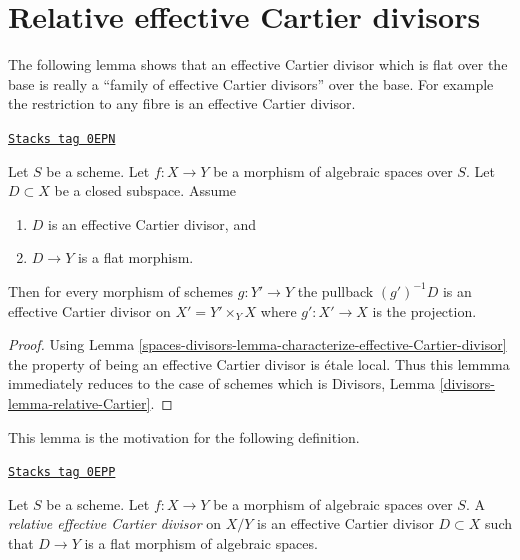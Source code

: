 \section{Relative effective Cartier divisors}
\label{spaces-divisors-section-effective-Cartier-morphisms}
The following lemma shows that an effective Cartier divisor which is
flat over the base is really a ``family of effective Cartier divisors''
over the base. For example the restriction to any fibre is an effective
Cartier divisor.

\begin{lemma}
\label{spaces-divisors-lemma-relative-Cartier}
\href{https://stacks.math.columbia.edu/tag/0EPN}{\texttt{Stacks tag 0EPN}}

Let $S$ be a scheme. Let $f : X \to Y$ be a morphism of
algebraic spaces over $S$. Let $D \subset X$ be a closed subspace.
Assume
\begin{enumerate}
\item $D$ is an effective Cartier divisor, and
\item $D \to Y$ is a flat morphism.
\end{enumerate}
Then for every morphism of schemes $g : Y' \to Y$ the pullback
$(g')^{-1}D$ is an effective Cartier divisor on $X' = Y' \times_Y X$
where $g' : X' \to X$ is the projection.
\end{lemma}

\begin{proof}
Using Lemma \ref{spaces-divisors-lemma-characterize-effective-Cartier-divisor}
the property of being an effective Cartier divisor is \'etale local.
Thus this lemmma immediately reduces to the case of schemes
which is Divisors, Lemma \ref{divisors-lemma-relative-Cartier}.
\end{proof}

This lemma is the motivation for the following definition.

\begin{definition}
\label{spaces-divisors-definition-relative-effective-Cartier-divisor}
\href{https://stacks.math.columbia.edu/tag/0EPP}{\texttt{Stacks tag 0EPP}}

Let $S$ be a scheme.
Let $f : X \to Y$ be a morphism of algebraic spaces over $S$.
A {\it relative effective Cartier divisor} on $X/Y$ is an
effective Cartier divisor $D \subset X$ such that $D \to Y$
is a flat morphism of algebraic spaces.
\end{definition}


